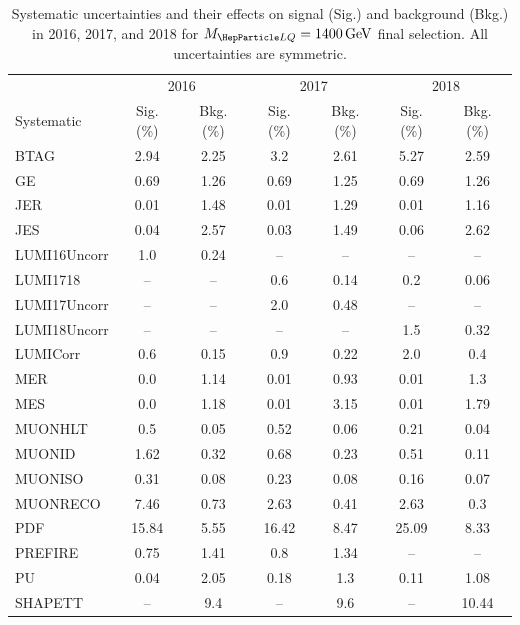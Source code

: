 \begin{table}[H]
	\begin{center}
        \begin{footnotesize}
			\caption{Systematic uncertainties and their effects on signal (Sig.) and background (Bkg.) in 2016, 2017, and 2018 for $\MLQ = \SI{1400}{GeV}$ final selection. All uncertainties are symmetric.}
			\begin{tabular}{lcccccc} \hline \hline
				& \multicolumn{2}{c}{2016} & \multicolumn{2}{c}{2017} & \multicolumn{2}{c}{2018} \\
				Systematic & Sig. (\%) & Bkg. (\%) & Sig. (\%) & Bkg. (\%) & Sig. (\%) & Bkg. (\%) \\ \hline
				BTAG &  2.94  &  2.25 &  3.2  &  2.61 &  5.27  &  2.59 \\
				GE &  0.69  &  1.26 &  0.69  &  1.25 &  0.69  &  1.26 \\
				JER &  0.01  &  1.48 &  0.01  &  1.29 &  0.01  &  1.16 \\
				JES &  0.04  &  2.57 &  0.03  &  1.49 &  0.06  &  2.62 \\
				LUMI16Uncorr &  1.0  &  0.24 & -- & -- & -- & -- \\
				LUMI1718 & -- & -- &  0.6  &  0.14 &  0.2  &  0.06 \\
				LUMI17Uncorr & -- & -- &  2.0  &  0.48 & -- & -- \\
				LUMI18Uncorr & -- & -- & -- & -- &  1.5  &  0.32 \\
				LUMICorr &  0.6  &  0.15 &  0.9  &  0.22 &  2.0  &  0.4 \\
				MER &  0.0  &  1.14 &  0.01  &  0.93 &  0.01  &  1.3 \\
				MES &  0.0  &  1.18 &  0.01  &  3.15 &  0.01  &  1.79 \\
				MUONHLT &  0.5  &  0.05 &  0.52  &  0.06 &  0.21  &  0.04 \\
				MUONID &  1.62  &  0.32 &  0.68  &  0.23 &  0.51  &  0.11 \\
				MUONISO &  0.31  &  0.08 &  0.23  &  0.08 &  0.16  &  0.07 \\
				MUONRECO &  7.46  &  0.73 &  2.63  &  0.41 &  2.63  &  0.3 \\
				PDF &  15.84  &  5.55 &  16.42  &  8.47 &  25.09  &  8.33 \\
				PREFIRE &  0.75  &  1.41 &  0.8  &  1.34 & -- & -- \\
				PU &  0.04  &  2.05 &  0.18  &  1.3 &  0.11  &  1.08 \\
				SHAPETT & -- &  9.4 & -- &  9.6 & -- &  10.44 \\

\end{tabular}
\end{footnotesize}
\end{center}
\end{table}
